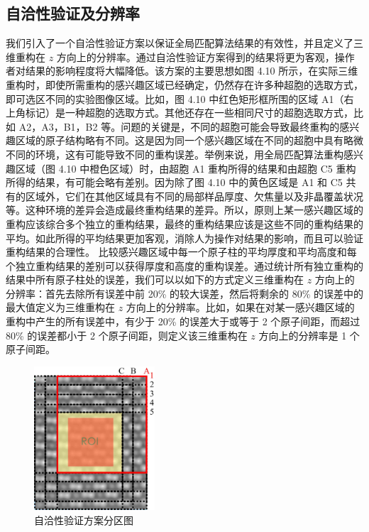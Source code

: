 \subsection{自洽性验证及分辨率}
我们引入了一个自洽性验证方案以保证全局匹配算法结果的有效性，并且定义了三维重构在 $z$ 方向上的分辨率。通过自洽性验证方案得到的结果将更为客观，操作者对结果的影响程度将大幅降低。该方案的主要思想如图 4.10 所示，在实际三维重构时，即使所需重构的感兴趣区域已经确定，仍然存在许多种超胞的选取方式，即可选区不同的实验图像区域。比如，图 4.10 中红色矩形框所围的区域 A1（右上角标记）是一种超胞的选取方式。其他还存在一些相同尺寸的超胞选取方式，比如 A2，A3，B1，B2 等。问题的关键是，不同的超胞可能会导致最终重构的感兴趣区域的原子结构略有不同。这是因为同一个感兴趣区域在不同的超胞中具有略微不同的环境，这有可能导致不同的重构误差。举例来说，用全局匹配算法重构感兴趣区域（图 4.10 中橙色区域）时，由超胞 A1 重构所得的结果和由超胞 C5 重构所得的结果，有可能会略有差别。因为除了图 4.10 中的黄色区域是 A1 和 C5 共有的区域外，它们在其他区域具有不同的局部样品厚度、欠焦量以及非晶覆盖状况等。这种环境的差异会造成最终重构结果的差异。所以，原则上某一感兴趣区域的重构应该综合多个独立的重构结果，最终的重构结果应该是这些不同的重构结果的平均。如此所得的平均结果更加客观，消除人为操作对结果的影响，而且可以验证重构结果的合理性。
比较感兴趣区域中每一个原子柱的平均厚度和平均高度和每个独立重构结果的差别可以获得厚度和高度的重构误差。通过统计所有独立重构的结果中所有原子柱处的误差，我们可以以如下的方式定义三维重构在 $z$ 方向上的分辨率：首先去除所有误差中前 20\% 的较大误差，然后将剩余的 80\% 的误差中的最大值定义为三维重构在 $z$ 方向上的分辨率。比如，如果在对某一感兴趣区域的重构中产生的所有误差中，有少于 20\% 的误差大于或等于 2 个原子间距，而超过 80\% 的误差都小于 2 个原子间距，则定义该三维重构在 $z$ 方向上的分辨率是 1 个原子间距。
\begin{figure}[htbp]
	\vspace{\baselineskip}
	\centering
	\includegraphics[width=0.4\textwidth]{../2.9/29}
	\caption{自洽性验证方案分区图}\label{fig:29}
	\song{}
\end{figure}

